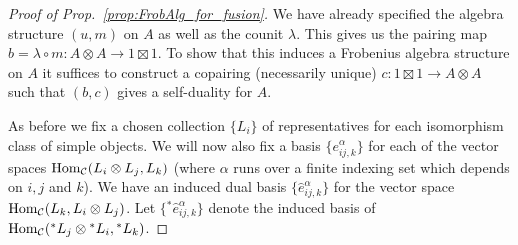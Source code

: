 \documentclass{amsart}
\begin{document}
\begin{proof}[Proof of Prop.~\ref{prop:FrobAlg_for_fusion}] 
We have already specified the algebra structure $(u,m)$ on $A$ as well as the counit $\lambda$. This gives us the pairing map $b= \lambda \circ m: A \otimes A \to 1 \boxtimes 1$. To show that this induces a Frobenius algebra structure on $A$ it suffices to construct a copairing (necessarily unique) $c: 1 \boxtimes 1 \to A \otimes A$ such that $(b,c)$ gives a self-duality for $A$. 	
	
	

As before we fix a chosen collection $\{L_i\}$ of representatives for each isomorphism class of simple objects. 	
We will now also fix a basis $\{e_{ij, k}^\alpha\}$ for each of the vector spaces $\operatorname{Hom}_{\mathcal C}(L_i \otimes L_j, L_k)$ (where $\alpha$ runs over a finite indexing set which depends on $i,j$ and $k$). We have an induced dual basis $\{\hat{e}_{ij, k}^\alpha \}$ for the vector space $\operatorname{Hom}_{\mathcal C}(L_k, L_i \otimes L_j)$. Let $\{{}^*\hat{e}_{ij, k}^\alpha\}$ denote the induced basis of $\operatorname{Hom}_{\mathcal C}({}^*L_j \otimes {}^*L_i, {}^*L_k)$. 


\end{proof}
\end{document}
